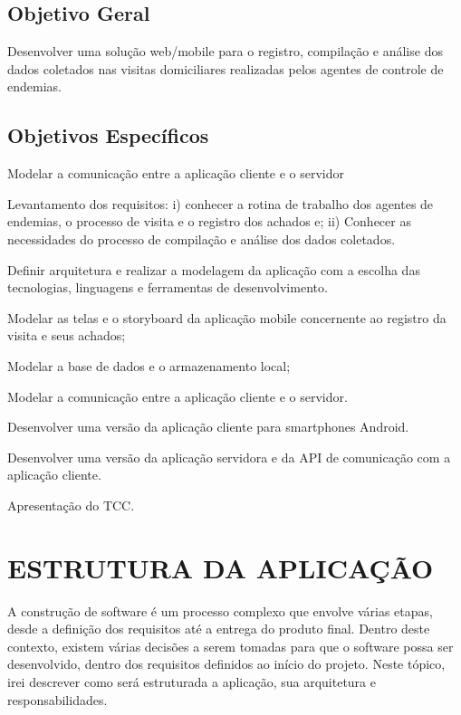 \section{Objetivo Geral}
\label{subsec:objgeral}
Desenvolver uma solução web/mobile para o registro, compilação e análise dos dados coletados nas visitas domiciliares realizadas pelos agentes de controle de endemias.


\section{Objetivos Específicos}
\label{subsec:objespc}
Modelar a comunicação entre a aplicação cliente e o servidor
 \begin{list}{--}{ }
 	\item Levantamento dos requisitos: i) conhecer a  rotina de trabalho dos agentes de endemias, o processo de visita e o registro dos achados e; ii) Conhecer as necessidades do processo de compilação e análise dos dados coletados.
 	\item Definir arquitetura e realizar a modelagem da aplicação com a escolha das tecnologias, linguagens e ferramentas  de desenvolvimento.
 	\item Modelar as telas e o storyboard da aplicação mobile concernente ao registro da visita e seus achados;
 	\item Modelar a base de dados e o armazenamento local;
 	\item Modelar a comunicação entre a aplicação cliente e o servidor.
 	\item Desenvolver uma versão da aplicação cliente para smartphones Android.
 	\item Desenvolver uma versão da aplicação servidora e da API de comunicação com a aplicação cliente.
 	\item Apresentação do TCC.
 \end{list}


\chapter{ESTRUTURA DA APLICAÇÃO}
A construção de software é um processo complexo que envolve várias etapas, desde a definição dos requisitos até a entrega do produto final. Dentro deste contexto, existem várias decisões a serem tomadas para que o software possa ser desenvolvido, dentro dos requisitos definidos ao início do projeto. Neste tópico, irei descrever como será estruturada a aplicação, sua arquitetura e responsabilidades.

